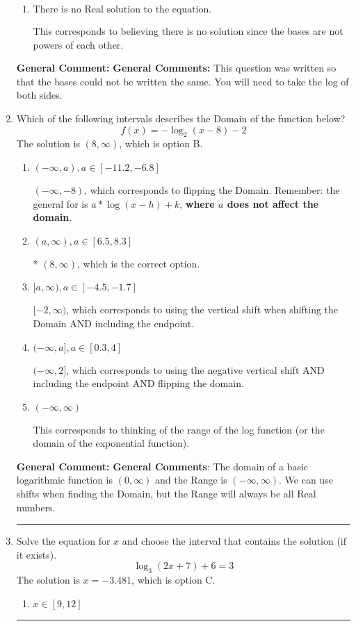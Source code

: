 \documentclass{extbook}[14pt]
\newcommand{\litem}[1]{\item #1

\rule{\textwidth}{0.4pt}}
\begin{document}
\begin{enumerate}
{\begin{enumerate}[label=\Alph*.]
* $x = -17.567$, which is the correct option.
\item \( \text{There is no Real solution to the equation.} \)

This corresponds to believing there is no solution since the bases are not powers of each other.
\end{enumerate}

\textbf{General Comment:} \textbf{General Comments:} This question was written so that the bases could not be written the same. You will need to take the log of both sides.
}
\litem{
Which of the following intervals describes the Domain of the function below?
\[ f(x) = -\log_2{(x-8)}-2 \]The solution is \( (8, \infty) \), which is option B.\begin{enumerate}[label=\Alph*.]
\item \( (-\infty, a), a \in [-11.2, -6.8] \)

$(-\infty, -8)$, which corresponds to flipping the Domain. Remember: the general for is $a*\log(x-h)+k$, \textbf{where $a$ does not affect the domain}.
\item \( (a, \infty), a \in [6.5, 8.3] \)

* $(8, \infty)$, which is the correct option.
\item \( [a, \infty), a \in [-4.5, -1.7] \)

$[-2, \infty)$, which corresponds to using the vertical shift when shifting the Domain AND including the endpoint.
\item \( (-\infty, a], a \in [0.3, 4] \)

$(-\infty, 2]$, which corresponds to using the negative vertical shift AND including the endpoint AND flipping the domain.
\item \( (-\infty, \infty) \)

This corresponds to thinking of the range of the log function (or the domain of the exponential function).
\end{enumerate}

\textbf{General Comment:} \textbf{General Comments}: The domain of a basic logarithmic function is $(0, \infty)$ and the Range is $(-\infty, \infty)$. We can use shifts when finding the Domain, but the Range will always be all Real numbers.
}
\litem{
Solve the equation for $x$ and choose the interval that contains the solution (if it exists).
\[ \log_{3}{(2x+7)}+6 = 3 \]The solution is \( x = -3.481 \), which is option C.\begin{enumerate}[label=\Alph*.]
\item \( x \in [9, 12] \)


\end{enumerate}}
\end{enumerate}
\end{document}
